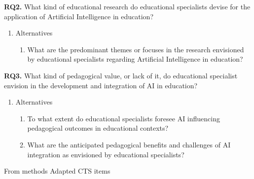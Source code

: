 \item[] \textbf{RQ2.} What kind of educational research do educational specialists devise for the application of Artificial Intelligence in education?
    \begin{enumerate}
        \item[] Alternatives
        \begin{enumerate}
            \item What are the predominant themes or focuses in the research envisioned by educational specialists regarding Artificial Intelligence in education? 
        \end{enumerate}
    \end{enumerate}
    \item [] \textbf{RQ3.} What kind of pedagogical value, or lack of it, do educational specialist envision in the development and integration of AI in education?
    \begin{enumerate}
        \item [] Alternatives
        \begin{enumerate}
            \item To what extent do educational specialists foresee AI influencing pedagogical outcomes in educational contexts?
            \item What are the anticipated pedagogical benefits and challenges of AI integration as envisioned by educational specialists? 
        \end{enumerate}
    \end{enumerate}


From methods
Adapted CTS items



